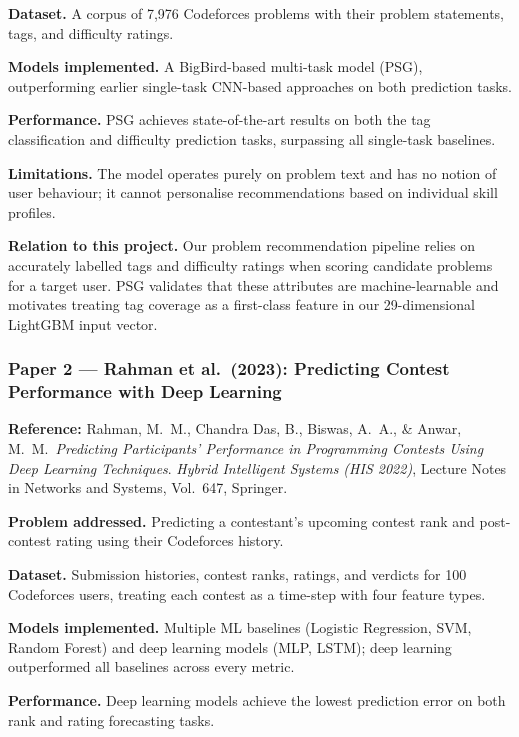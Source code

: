 \documentclass[12pt,a4paper]{article}
\begin{document}
\textbf{Dataset.}
A corpus of 7,976 Codeforces problems with their problem statements,
tags, and difficulty ratings.
 
\textbf{Models implemented.}
A BigBird-based multi-task model (PSG), outperforming earlier single-task
CNN-based approaches on both prediction tasks.
 
\textbf{Performance.}
PSG achieves state-of-the-art results on both the tag classification
and difficulty prediction tasks, surpassing all single-task baselines.
 
\textbf{Limitations.}
The model operates purely on problem text and has no notion of user
behaviour; it cannot personalise recommendations based on individual
skill profiles.
 
\textbf{Relation to this project.}
Our problem recommendation pipeline relies on accurately labelled tags
and difficulty ratings when scoring candidate problems for a target user.
PSG validates that these attributes are machine-learnable and motivates
treating tag coverage as a first-class feature in our 29-dimensional
LightGBM input vector.
 
 
\subsubsection*{Paper 2 — Rahman et al.\ (2023): Predicting Contest Performance with Deep Learning}
 
\textbf{Reference:}
Rahman, M.\ M., Chandra Das, B., Biswas, A.\ A., \& Anwar, M.\ M.\
\textit{Predicting Participants' Performance in Programming Contests Using
Deep Learning Techniques}. \textit{Hybrid Intelligent Systems (HIS 2022)},
Lecture Notes in Networks and Systems, Vol.\ 647, Springer. \cite{rahman2023predicting}
 
\textbf{Problem addressed.}
Predicting a contestant's upcoming contest rank and post-contest rating
using their Codeforces history.
 
\textbf{Dataset.}
Submission histories, contest ranks, ratings, and verdicts for
100 Codeforces users, treating each contest as a time-step with four
feature types.
 
\textbf{Models implemented.}
Multiple ML baselines (Logistic Regression, SVM, Random Forest) and
deep learning models (MLP, LSTM); deep learning outperformed all
baselines across every metric.
 
\textbf{Performance.}
Deep learning models achieve the lowest prediction error on both
rank and rating forecasting tasks.
 
\end{document}
